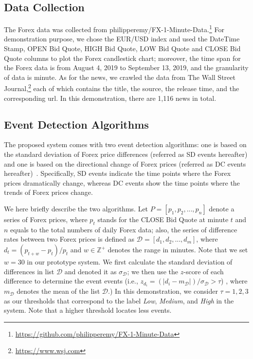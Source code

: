 \documentclass[sigconf]{acmart}
\begin{document}
\subsection{Data Collection}
The Forex data was collected from philipperemy/FX-1-Minute-Data.\footnote{\url{https://github.com/philipperemy/FX-1-Minute-Data}}
For demonstration purpose, we chose the EUR/USD index and used the DateTime Stamp, OPEN Bid Quote, HIGH Bid Quote, LOW Bid Quote and CLOSE Bid Quote columns to plot the Forex candlestick chart; moreover, the time span for the Forex data is from August 4, 2019 to September 13, 2019, and the granularity of data is minute. 
As for the news, we crawled the data from The Wall Street Journal,\footnote{\url{https://www.wsj.com}} each of which contains the title, the source, the release time, and the corresponding url.
In this demonstration, there are 1,116 news in total.

\subsection{Event Detection Algorithms}\label{sec:algo}
The proposed system comes with two event detection algorithms: one is based on the standard deviation of Forex price differences (referred as SD events hereafter) and one is based on the directional change of Forex prices (referred as DC events hereafter)~\cite{7850020}. 
Specifically, SD events indicate the time points where the Forex prices dramatically change, whereas DC events show the time points where the trends of Forex prices change.

We here briefly describe the two algorithms.
Let $P= [p_1, p_2, ..., p_n]$ denote a series of Forex prices, where $p_t$ stands for the CLOSE Bid Quote at minute $t$ and $n$ equals to the total numbers of daily Forex data; also, the series of difference rates between two Forex prices is defined as $\mathcal{D}= [d_1, d_2, ..., d_m]$, where $d_t = {(p_{t+w}-p_t)}/{p_t}$ and $w\in\mathbb Z^+$ denotes the range in minutes.
Note that we set $w=30$ in our prototype system.
We first calculate the standard deviation of differences in list $\mathcal{D}$ and denoted it as $\sigma_\mathcal{D}$; we then use the $z$-score of each difference to determine the event events (i.e., $z_{d_i}=(|d_i-m_{\mathcal{D}}|)/\sigma_{\mathcal{D}}>\tau$) , where $m_{\mathcal{D}}$ denotes the mean of the list $\mathcal{D}$.)
In this demonstration, we consider $\tau=1,2,3$ as our thresholds that correspond to the label \emph{Low}, \emph{Medium}, and \emph{High} in the system. 
Note that a higher threshold locates less events.
\end{document}
